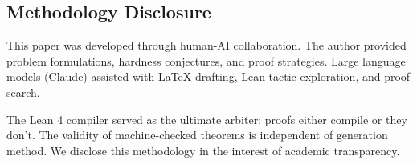 \subsection*{Methodology Disclosure}

This paper was developed through human-AI collaboration. The author provided problem formulations, hardness conjectures, and proof strategies. Large language models (Claude) assisted with LaTeX drafting, Lean tactic exploration, and proof search.

The Lean 4 compiler served as the ultimate arbiter: proofs either compile or they don't. The validity of machine-checked theorems is independent of generation method. We disclose this methodology in the interest of academic transparency.


\appendix
